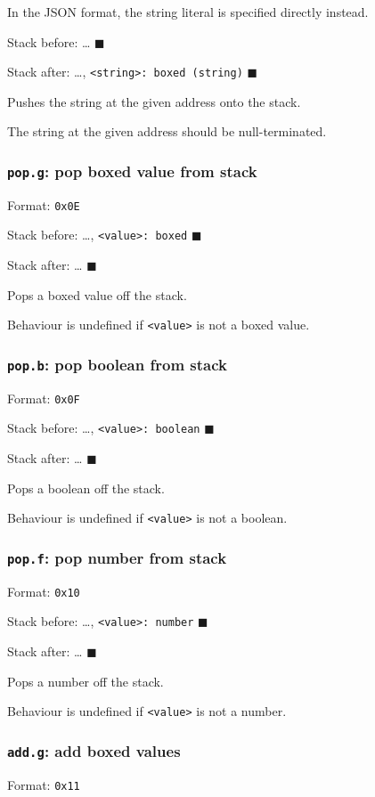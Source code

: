 In the JSON format, the string literal is specified directly instead.

Stack before: \ldots{} \(\blacksquare\)

Stack after: \ldots{}, \texttt{<string>: boxed (string)} \(\blacksquare\)

Pushes the string at the given address onto the stack.

The string at the given address should be null-terminated.

\subsubsection{\texttt{pop.g}: pop boxed value from stack}
\label{sec:org5cb332a}
Format: \texttt{0x0E}

Stack before: \ldots{}, \texttt{<value>: boxed} \(\blacksquare\)

Stack after: \ldots{} \(\blacksquare\)

Pops a boxed value off the stack.

Behaviour is undefined if \texttt{<value>} is not a boxed value.

\subsubsection{\texttt{pop.b}: pop boolean from stack}
\label{sec:org55a65aa}
Format: \texttt{0x0F}

Stack before: \ldots{}, \texttt{<value>: boolean} \(\blacksquare\)

Stack after: \ldots{} \(\blacksquare\)

Pops a boolean off the stack.

Behaviour is undefined if \texttt{<value>} is not a boolean.

\subsubsection{\texttt{pop.f}: pop number from stack}
\label{sec:orgf652769}
Format: \texttt{0x10}

Stack before: \ldots{}, \texttt{<value>: number} \(\blacksquare\)

Stack after: \ldots{} \(\blacksquare\)

Pops a number off the stack.

Behaviour is undefined if \texttt{<value>} is not a number.

\subsubsection{\texttt{add.g}: add boxed values}
\label{sec:orgd3666a0}
Format: \texttt{0x11}

